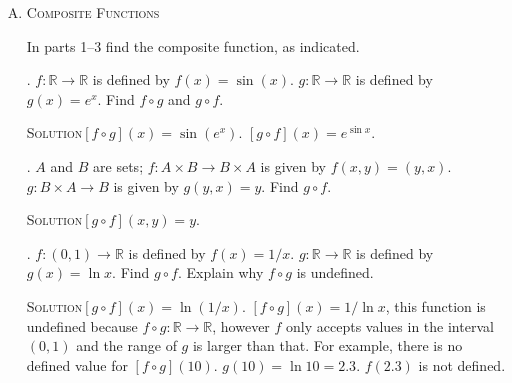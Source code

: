 \documentclass[twoside]{amsart}
\newcommand{\solution}{\textsc{Solution}\xspace}
\begin{document}
\begin{enumerate}[A.]
   \noindent $f$ is surjective. \begin{proof} Take any element $s\in G$,
   then $s=f(x)$ for $x=a^{-1}s$. $f(a^{-1}s)=a(a^{-1}s)=s$.\end{proof}

   . $G$ is a group and $f:G\to G$ is defined by $f(x)=x^{-1}$.

   \noindent $f$ is injective. \begin{proof} Suppose $f(a)=f(b)$ then 
   $a^{-1}=b^{-1}$. So $ba^{-1}a=bb^{-1}a$. Therefore $b=a$.\end{proof}

   \noindent $f$ is surjective.\begin{proof} For every $y$, $y=f(x)$
   for $x=y^{-1}$. Check: $f(y^{-1})=(y^{-1})^{-1}=y$.\end{proof}

   . $G$ is a group and $f:G \to G$ is defined by $f(x)=x^2$.
   
   \noindent $f$ is not guaranteed to be injective.  A counter-example can be
   found in the matrix group $G$ of chapter 3. $f(A)=AA=f(C)=CC=I$ yet $A\ne
   C$.

   \noindent $f$ is not guaranteed to be surjective.  Again, a counter-example
   can be found from $G$. There is no element $x$ in $G$ such that $f(x)=xx=C$.

   \item \textsc{Composite Functions}

   \noindent In parts 1--3 find the composite function, as indicated.

   . $f:\mathbb{R}\to\mathbb{R}$ is defined by $f(x)=\sin (x)$.
   $g:\mathbb{R}\to\mathbb{R}$ is defined by $g(x)=e^x$. Find $f\circ g$ 
   and $g\circ f$.

   \noindent \solution $[f\circ g](x) = \sin (e^x)$. 
   $[g\circ f](x) = e^{\sin x}$.

   . $A$ and $B$ are sets; $f:A\times B \to B \times A$ is given
   by $f(x,y)=(y,x)$. $g:B \times A \to B$ is given by $g(y,x)=y$.
   Find $g \circ f$.

   \noindent \solution $\displaystyle \left[g \circ f\right](x,y)=y$.

   . $f:(0,1)\to\mathbb{R}$ is defined by $f(x)=1/x$.
   $g:\mathbb{R}\to\mathbb{R}$ is defined by $g(x)=\ln x$. Find
   $g \circ f$. Explain why $f \circ g$ is undefined.

   \noindent \solution $[g \circ f](x)=\ln(1/x)$.
   $[f \circ g](x)=1/\ln x$, this function is undefined because
   $f \circ g:\mathbb{R}\to\mathbb{R}$, however $f$ only accepts
   values in the interval $(0,1)$ and the range of $g$ is larger 
   than that. For example, there is no defined value for
   $[f \circ g](10)$. $g(10)=\ln 10=2.3$. $f(2.3)$ is not defined.


\end{enumerate}
\end{document}
